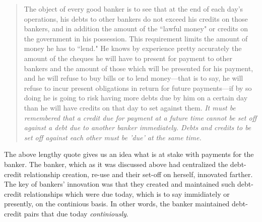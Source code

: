 \begin{quote}\label{innes_on_good_banker}
The object of every good banker is to see that at the end of each day's operations, his debts to other bankers do not exceed his credits on those bankers, and in addition the amount of the ``lawful money" or credits on the government in his possession. This requirement limits the amount of money he has to ``lend." He knows by experience pretty accurately the amount of the cheques he will have to present for payment to other bankers and the amount of those which will be presented for his payment, and he will refuse to buy bills or to lend money---that is to say, he will refuse to incur present obligations in return for future payments---if by so doing he is going to risk having more debts due by him on a certain day than he will have credits on that day to set against them. \textit{It must be remembered that a credit due for payment at a future time cannot be set off against a debt due to another banker immediately. Debts and credits to be set off against each other must be 'due' at the same time.}~\citep[p.~403, emphasis added]{innes1913} 
\end{quote}

The above lengthy quote gives us an idea what is at stake with payments for the banker. The banker, which as it was discussed above had centralized the debt-credit relationship creation, re-use and their set-off on herself, innovated farther. The key of bankers' innovation was that they created and maintained such debt-credit relationships which were due today, which is to say immidiately or presently, on the continious basis. In other words, the banker maintained debt-credit pairs that due today \textit{continiously}. 

